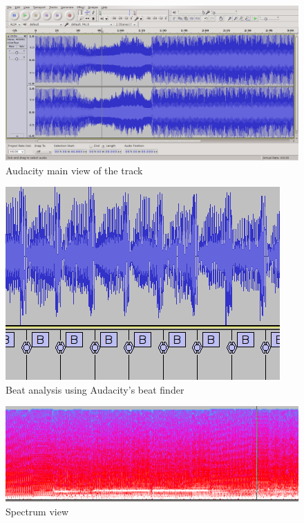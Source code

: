 \documentclass[a4paper, 12pt]{scrartcl}
\begin{document}
    \begin{figure}[H]
        \centering
        \includegraphics[scale=0.4]{audacity_main}
        \caption{Audacity main view of the track}
        \label{fig:main}
    \end{figure}

    \begin{figure}[H]
        \centering
        \includegraphics{audacity_beat}
        \caption{Beat analysis using Audacity's beat finder}
        \label{fig:beat}
    \end{figure}

    \begin{figure}[H]
        \centering
        \includegraphics{audacity_spectrum}
        \caption{Spectrum view}
        \label{fig:spectrogram}
    \end{figure}
\end{document}

